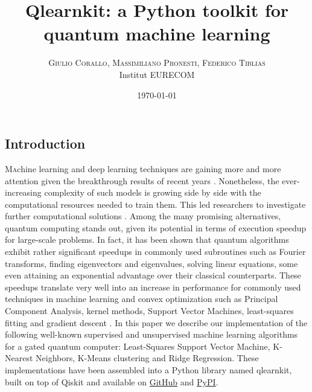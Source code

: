 \documentclass{article}
\title{Qlearnkit: a Python toolkit for quantum machine learning} %
\author{%
\textsc{Giulio Corallo, Massimiliano Pronesti, Federico Tiblias}\\
\normalsize Institut EURECOM \\ %
}
\date{\today} %
\begin{document}
\maketitle




\begin{multicols}{2}
\section {Introduction}\lettrine[nindent=0em,lines=3]{M}achine learning and deep learning techniques are gaining more and more attention given the breakthrough results of recent years \cite{Vaswani2017-lk} \cite{NIPS2012_c399862d}. Nonetheless, the ever-increasing complexity of such models is growing side by side with the computational resources needed to train them. This led researchers to investigate further computational solutions \cite{Buffoni2021-jg}. Among the many promising alternatives, quantum computing  stands out, given its potential in terms of execution speedup for large-scale problems. In fact, it has been shown that quantum algorithms exhibit rather significant speedups in commonly used subroutines such as Fourier transforms, finding eigenvectors and eigenvalues, solving linear equations, some even attaining an exponential advantage over their classical counterparts. These speedups translate very well into an increase in performance for commonly used techniques in machine learning and convex optimization such as Principal Component Analysis, kernel methods, Support Vector Machines, least-squares fitting and gradient descent \cite{Biamonte2016-rb}.  In this paper we describe our implementation of the following well-known supervised and unsupervised machine learning algorithms for a gated quantum computer: Least-Squares Support Vector Machine, K-Nearest Neighbors, K-Means clustering and Ridge Regression. These implementations have been assembled into a Python library named qlearnkit, built on top of Qiskit and available on \href{https://github.com/mspronesti/qlearnkit}{GitHub} and \href{https://pypi.org/project/qlearnkit}{PyPI}.




\end{multicols}
\end{document}
